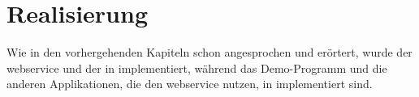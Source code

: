 \chapter{Realisierung}\label{ch:realisierung}

	Wie in den vorhergehenden Kapiteln schon angesprochen und erörtert,
	wurde der \gls{webservice}
	und der  in  implementiert,
	während das Demo-Programm
	und die anderen Applikationen,
	die den \gls{webservice} nutzen,
	in  implementiert sind.

	
	
	